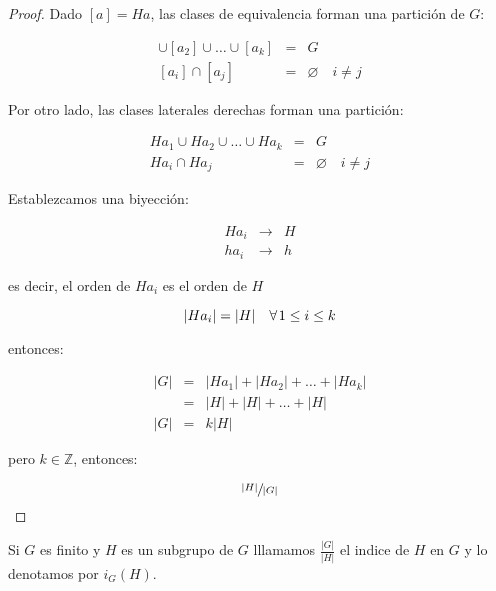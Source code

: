         \begin{proof}
            Dado $[a] = Ha$, las clases de equivalencia forman una partición de $G$:

            \begin{eqnarray*}
                [a_1] \cup [a_2] \cup \dots \cup [a_k] & = & G \\[0cm]
                [a_i] \cap [a_j] & = & \varnothing \quad i \ne j
            \end{eqnarray*}

            Por otro lado, las clases laterales derechas forman una partición:

            \begin{eqnarray*}
                H a_1 \cup H a_2 \cup \dots \cup H a_k & = & G \\
                H a_i \cap H a_j & = & \varnothing \quad i \ne j
            \end{eqnarray*}

            Establezcamos una biyección:

            \begin{eqnarray*}
                Ha_i & \to & H \\
                ha_i & \to & h
            \end{eqnarray*}

            es decir, el orden de $Ha_i$ es el orden de $H$

            \begin{equation*}
                |Ha_i| = |H| \quad \forall \mkern2mu 1 \le i \le k
            \end{equation*}

            entonces:

            \begin{eqnarray*}
                |G| & = & |Ha_1| + |Ha_2| + \dots + |Ha_k| \\
                & = & |H| + |H| + \dots + |H| \\
                |G| & = & k |H|
            \end{eqnarray*}

            pero $k \in \mathbb{Z}$, entonces:

            \begin{equation*}
                \sfrac{|H|}{|G|}
            \end{equation*}
        \end{proof}

        \begin{definicion}
            Si $G$ es finito y $H$ es un subgrupo de $G$ lllamamos $\frac{|G|}{|H|}$ el indice de $H$ en $G$ y lo denotamos por $i_G(H)$.
        \end{definicion}

